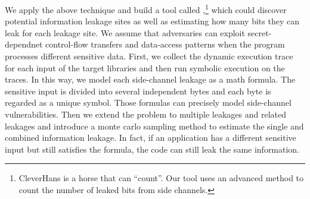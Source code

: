 We apply the above technique and build a tool called \tool{},\footnote{CleverHans is a horse that can ``count''.
Our tool uses an advanced method to count the number of leaked bits from side channels.}
which could discover potential information leakage sites 
as well as estimating how many bits they can leak for each leakage site. 
We assume that adversaries can exploit secret-dependnet control-flow transfers and 
data-access patterns when the program processes different sensitive data. 
First, we collect the dynamic execution trace for each input of the target libraries 
and then run symbolic execution on the traces. 
In this way, we model each side-channel leakage as a math formula. 
The sensitive input is divided into several independent bytes and each byte is regarded as 
a unique symbol. Those formulas can precisely model side-channel vulnerabilities.
Then we extend the problem to multiple leakages and related leakages
and introduce a monte carlo sampling method to estimate the single and combined information leakage.
In fact, if an application has a different sensitive input but still satisfies the formula, 
the code can still leak the same information. 





